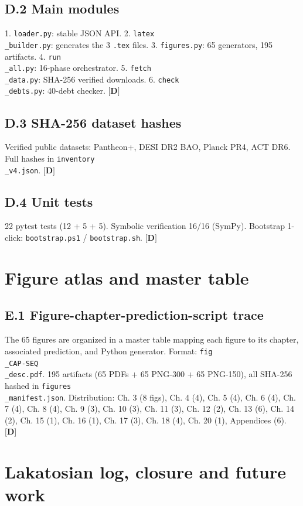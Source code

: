 ﻿\documentclass[11pt,letterpaper]{article}
\begin{document}
\subsection{D.2 Main modules}
1. \texttt{loader.py}: stable JSON API. 2. \texttt{latex\\\_builder.py}: generates the 3 \texttt{.tex} files. 3. \texttt{figures.py}: 65 generators, 195 artifacts. 4. \texttt{run\\\_all.py}: 16-phase orchestrator. 5. \texttt{fetch\\\_data.py}: SHA-256 verified downloads. 6. \texttt{check\\\_debts.py}: 40-debt checker. $\textbf{[D]}$
\subsection{D.3 SHA-256 dataset hashes}
Verified public datasets: Pantheon+, DESI DR2 BAO, Planck PR4, ACT DR6. Full hashes in \texttt{inventory\\\_v4.json}. $\textbf{[D]}$
\subsection{D.4 Unit tests}
22 pytest tests (12 + 5 + 5). Symbolic verification 16/16 (SymPy). Bootstrap 1-click: \texttt{bootstrap.ps1} / \texttt{bootstrap.sh}. $\textbf{[D]}$
\section{Figure atlas and master table}
\subsection{E.1 Figure-chapter-prediction-script trace}
The 65 figures are organized in a master table mapping each figure to its chapter, associated prediction, and Python generator. Format: \texttt{fig\\\_CAP-SEQ\\\_desc.pdf}. 195 artifacts (65 PDFs + 65 PNG-300 + 65 PNG-150), all SHA-256 hashed in \texttt{figures\\\_manifest.json}. Distribution: Ch. 3 (8 figs), Ch. 4 (4), Ch. 5 (4), Ch. 6 (4), Ch. 7 (4), Ch. 8 (4), Ch. 9 (3), Ch. 10 (3), Ch. 11 (3), Ch. 12 (2), Ch. 13 (6), Ch. 14 (2), Ch. 15 (1), Ch. 16 (1), Ch. 17 (3), Ch. 18 (4), Ch. 20 (1), Appendices (6). $\textbf{[D]}$
\section{Lakatosian log, closure and future work}
\end{document}
